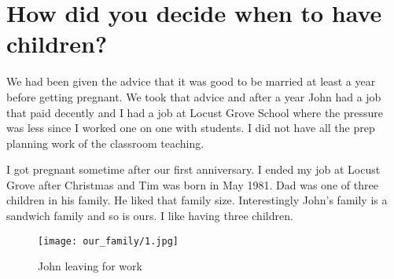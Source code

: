 \section{How did you decide when to have children?}
We had been given the advice that it was good to be married at least a year before getting pregnant.
We took that advice and after a year John had a job that paid decently and I had a job at Locust Grove School where the pressure was less since I worked one on one with students.
I did not have all the prep planning work of the classroom teaching.

I got pregnant sometime after our first anniversary.
I ended my job at Locust Grove after Christmas and Tim was born in May 1981.
Dad was one of three children in his family.
He liked that family size.
Interestingly John's family is a sandwich family and so is ours.
I like having three children.
\begin{figure}
\centering
\texttt{[image: our\_family/1.jpg]}
\caption{
John leaving for work
}
\end{figure}
